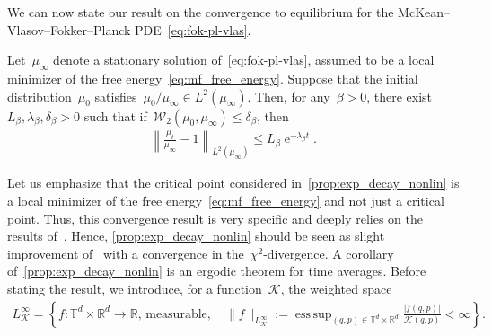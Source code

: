 \documentclass[onefignum,onetabnum]{siamart251216} %
\DeclareMathOperator{\e}{e}
\DeclareMathOperator*{\esssup}{ess\,sup}
\newcommand{\norm}[1]{\left\lVert#1\right\rVert}
\newcommand{\torus}{\mathbb T}
\newcommand{\real}{\mathbb R}
\newcommand{\mc}[1]{\mathcal{#1}}
\renewcommand{\leq}{\leqslant}
\newcommand{\mescin}{\mu}
\newcommand{\norml}[1]{\norm{#1}_{L^2(\mescin_\infty)}}
\theoremstyle{plain}
\numberwithin{equation}{section}
\numberwithin{theorem}{section}
\begin{document}
We can now state our result on the convergence to equilibrium for the McKean--Vlasov--Fokker--Planck PDE~\eqref{eq:fok-pl-vlas}.
\begin{proposition}
    \label{prop:exp_decay_nonlin}
   Let~$\mescin_\infty$ denote a stationary solution of~\eqref{eq:fok-pl-vlas}, assumed to be a local minimizer of the free energy~\eqref{eq:mf_free_energy}. Suppose that the initial distribution~$\mescin_0$ satisfies~$\mescin_0/\mescin_\infty \in L^2(\mescin_\infty)$.
Then, for any~$\beta > 0$, there exist~$L_\beta,\lambda_\beta,\delta_\beta > 0$ such that if~$\mc{W}_2(\mescin_0, \mescin_\infty) \leq \delta_\beta$,
then
    \begin{align}
        \label{eq:exp_decay_CI}
    \norml{\displaystyle\frac{\mescin_t}{\mescin_\infty} -1} \leq L_\beta\e^{-\lambda_\beta t}.
    \end{align}
\end{proposition}
Let us emphasize that the critical point considered in~\cref{prop:exp_decay_nonlin} is a local minimizer of the free energy~\eqref{eq:mf_free_energy} and not just a critical point. Thus, this convergence result is very specific and deeply relies on the results of~\cite[Theorem 20]{monmarche2024local}. Hence, \cref{prop:exp_decay_nonlin} should be seen as slight improvement of~\cite[Theorem 20]{monmarche2024local} with a convergence in the~$\chi^2$-divergence. %
A corollary of~\cref{prop:exp_decay_nonlin} is an ergodic theorem for time averages. Before stating the result, we introduce, for a function~$\mc{K}$, the weighted space
\begin{align*}
    L^{\infty}_{\mathcal K } = \left\{f:\torus^d \times \real^d \rightarrow \real,\,\text{measurable},\quad \|f\|_{L^{\infty}_{\mathcal K }} := \esssup_{(q,p) \in \torus^d \times \real^d} \frac{|f(q,p)|}{\mathcal K (q,p)} < \infty \right\}.
\end{align*}
\end{document}
